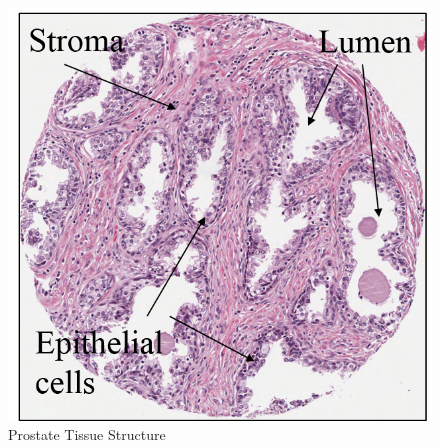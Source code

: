 \begin{figure}[!htb]
\centering
\includegraphics[scale=0.3]{figs/tissue_structure1.png}
\caption{Prostate Tissue Structure}\label{fig:tissue_structure1}
\centering
\end{figure}


